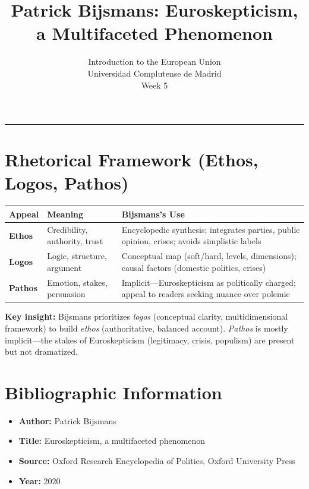 \documentclass[11pt,a4paper]{article}
\begin{document}
\title{Patrick Bijsmans: Euroskepticism, a Multifaceted Phenomenon}
\author{Introduction to the European Union\\Universidad Complutense de Madrid\\Week 5}
\date{}
\maketitle
\vspace{-1em}
\hrule
\vspace{1em}

\section*{Rhetorical Framework (Ethos, Logos, Pathos)}

\begin{table}[h]
\centering
\begin{tabular}{@{}lll@{}}
\toprule
\textbf{Appeal} & \textbf{Meaning} & \textbf{Bijsmans's Use} \\
\midrule
\textbf{Ethos} & Credibility, authority, trust & Encyclopedic synthesis; integrates parties, public opinion, crises; avoids simplistic labels \\
\textbf{Logos} & Logic, structure, argument & Conceptual map (soft/hard, levels, dimensions); causal factors (domestic politics, crises) \\
\textbf{Pathos} & Emotion, stakes, persuasion & Implicit---Euroskepticism as politically charged; appeal to readers seeking nuance over polemic \\
\bottomrule
\end{tabular}
\end{table}

\textbf{Key insight:} Bijsmans prioritizes \textit{logos} (conceptual clarity, multidimensional framework) to build \textit{ethos} (authoritative, balanced account). \textit{Pathos} is mostly implicit---the stakes of Euroskepticism (legitimacy, crisis, populism) are present but not dramatized.

\section*{Bibliographic Information}

\begin{itemize}
\item \textbf{Author:} Patrick Bijsmans
\item \textbf{Title:} Euroskepticism, a multifaceted phenomenon
\item \textbf{Source:} Oxford Research Encyclopedia of Politics, Oxford University Press
\item \textbf{Year:} 2020
\end{itemize}
\end{document}
